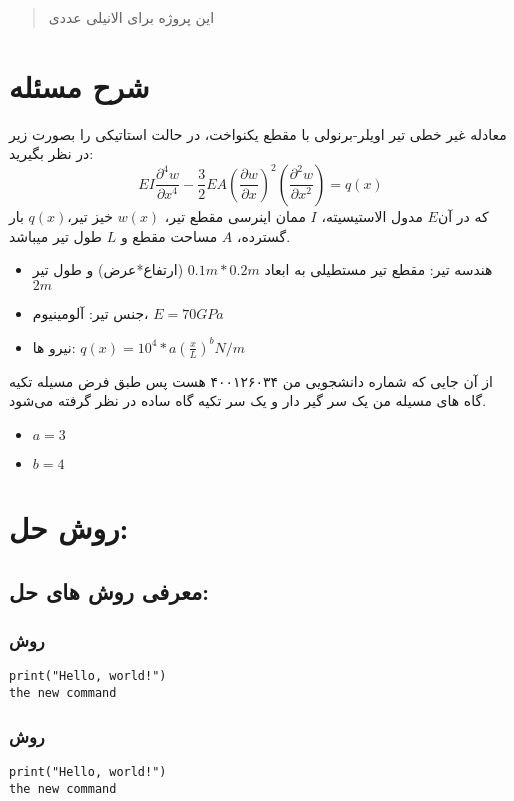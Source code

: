 \documentclass[12pt]{article}
\begin{document}
\fontsize{12pt}{14pt}\selectfont



\begin{abstract}
\noindent
این پروژه برای الانیلی عددی
\end{abstract}

\section{شرح مسئله}

معادله غیر خطی تیر اویلر-برنولی با مقطع یکنواخت، در حالت استاتیکی را بصورت زیر در نظر بگیرید:
\begin{equation}
	E I \frac{\partial^4 w}{\partial x^4}-\frac{3}{2} E A\left(\frac{\partial w}{\partial x}\right)^2\left(\frac{\partial^2 w}{\partial x^2}\right)=q(x)
\end{equation}
که در آن$E$ مدول الاستیسیته، $I$ ممان اینرسی مقطع تیر، $w(x)$ خیز تیر،$q(x)$ بار گسترده، $A$ مساحت مقطع و $L$ طول تیر میباشد.
\\
\begin{itemize}
  \item هندسه تیر: مقطع تیر مستطیلی به ابعاد $0.1m * 0.2m$ (ارتفاع*عرض) و طول تیر $2m$ 
  \item جنس تیر: آلومینیوم، $E = 70GPa$
  \item نیرو ها: $q(x)=10^4 * a\left(\frac{x}{L}\right)^b N / m$
\end{itemize}
از آن جایی که شماره دانشجویی من ۴۰۰۱۲۶۰۳۴  هست پس طبق فرض مسيله تکیه گاه های مسيله من یک سر گیر دار و یک سر تکیه گاه ساده در نظر گرفته می‌شود.
\begin{itemize}
	\item $a=3$
	\item $b=4$
\end{itemize}
	
\section{ روش حل:}
\subsection{معرفی روش های حل:}
\subsubsection{روش }

\begin{latin}
\begin{verbatim}
print("Hello, world!")
the new command 
\end{verbatim}
\end{latin}

\subsubsection{روش }

\begin{latin}
\begin{verbatim}
print("Hello, world!")
the new command 
\end{verbatim}
\end{latin}
\end{document}

